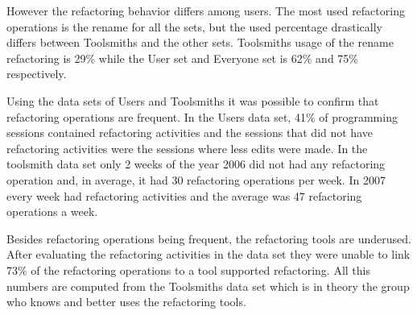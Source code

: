 However the refactoring behavior differs among users. The most used refactoring operations is the rename for all the sets, but the used percentage drastically differs between Toolsmiths and the other sets. Toolsmiths usage of the rename refactoring is 29\% while the User set and Everyone set is 62\% and 75\% respectively.

Using the data sets of Users and Toolsmiths it was possible to confirm that refactoring operations are frequent. 
In the Users data set, 41\% of programming sessions contained refactoring activities and the sessions that did not have refactoring activities were the sessions where less edits were made.
In the toolsmith data set only 2 weeks of the year 2006 did not had any refactoring operation and, in average, it had 30 refactoring operations per week. 
In 2007 every week had refactoring activities and the average was 47 refactoring operations a week.

Besides refactoring operations being frequent, the refactoring tools are underused. 
After evaluating the refactoring activities in the data set they were unable to link 73\% of the refactoring operations to a tool supported refactoring. 
All this numbers are computed from the Toolsmiths data set which is in theory the group who knows and better uses the refactoring tools.


